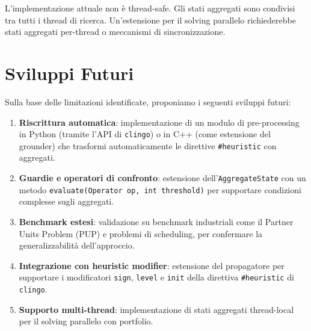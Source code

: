 \documentclass[a4paper,12pt,twoside,openright]{report}
\newcommand{\clingo}{\texttt{clingo}}
\begin{document}
L'implementazione attuale non \`{e} thread-safe. Gli stati aggregati sono condivisi tra tutti i thread di ricerca. Un'estensione per il solving parallelo richiederebbe stati aggregati per-thread o meccanismi di sincronizzazione.

\section{Sviluppi Futuri}

Sulla base delle limitazioni identificate, proponiamo i seguenti sviluppi futuri:

\begin{enumerate}
    \item \textbf{Riscrittura automatica}: implementazione di un modulo di pre-processing in Python (tramite l'API di \clingo{}) o in C++ (come estensione del grounder) che trasformi automaticamente le direttive \texttt{\#heuristic} con aggregati.

    \item \textbf{Guardie e operatori di confronto}: estensione dell'\texttt{AggregateState} con un metodo \texttt{evaluate(Operator op, int threshold)} per supportare condizioni complesse sugli aggregati.

    \item \textbf{Benchmark estesi}: validazione su benchmark industriali come il Partner Units Problem (PUP) e problemi di scheduling, per confermare la generalizzabilit\`{a} dell'approccio.

    \item \textbf{Integrazione con heuristic modifier}: estensione del propagatore per supportare i modificatori \texttt{sign}, \texttt{level} e \texttt{init} della direttiva \texttt{\#heuristic} di \clingo{}.

    \item \textbf{Supporto multi-thread}: implementazione di stati aggregati thread-local per il solving parallelo con portfolio.
\end{enumerate}

\end{document}
